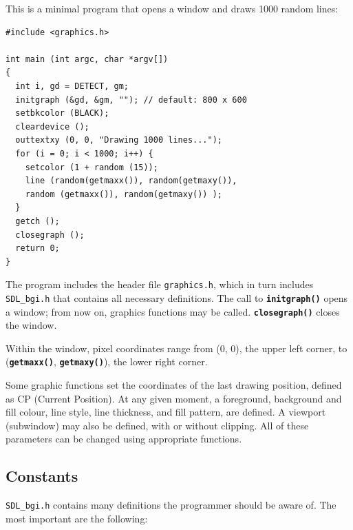 \documentclass[a4paper,12pt]{article}
\newcommand{\func}[1]{\textbf{\texttt{#1}}}  %
\newcommand{\F}[1]{\texttt{#1}}     %
\begin{document}
This is a minimal program that opens a  window and draws 1000 random
lines:

\begin{small}
\begin{spacing}{0.9}
\begin{verbatim}
#include <graphics.h>

int main (int argc, char *argv[])
{
  int i, gd = DETECT, gm;
  initgraph (&gd, &gm, ""); // default: 800 x 600
  setbkcolor (BLACK);
  cleardevice ();
  outtextxy (0, 0, "Drawing 1000 lines...");
  for (i = 0; i < 1000; i++) {
    setcolor (1 + random (15));
    line (random(getmaxx()), random(getmaxy()),
    random (getmaxx()), random(getmaxy()) );
  }
  getch ();
  closegraph ();
  return 0;
}
\end{verbatim}
\end{spacing}
\end{small}

The program includes the header file \F{graphics.h}, which in turn
includes \F{SDL\_bgi.h} that contains all necessary definitions. The
call to \func{initgraph()} opens a window; from now on, graphics
functions may be called. \func{closegraph()} closes the window.

Within the window, pixel coordinates range from (0, 0), the upper left
corner, to (\func{get\-maxx()}, \func{getmaxy()}), the lower right
corner.

Some graphic functions set the coordinates of the last drawing
position, defined as CP (Current Position). At any given moment, a
foreground, background and fill colour, line style, line thickness,
and fill pattern, are defined. A viewport (subwindow) may also be
defined, with or without clipping. All of these parameters can be
changed using appropriate functions.


\subsection{Constants}

\F{SDL\_bgi.h} contains many definitions the programmer should be
aware of. The most important are the following:
\end{document}
